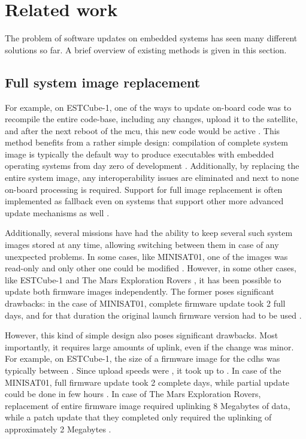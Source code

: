 \newpage
\section{Related work}

The problem of software updates on embedded systems has seen many different solutions so far. A brief overview of existing methods is given in this section.

\subsection{Full system image replacement}

For example, on ESTCube-1, one of the ways to update on-board code was to recompile the entire code-base, including any changes, upload it to the satellite, and after the next reboot of the \gls{mcu}, this new code would be active \cite{Suenter2016}. This method benefits from a rather simple design: compilation of complete system image is typically the default way to produce executables with embedded operating systems from day zero of development . Additionally, by replacing the entire system image, any interoperability issues are eliminated and next to none on-board processing is required. Support for full image replacement is often implemented as fallback even on systems that support other more advanced update mechanisms as well \cite{Tarbe2013,Greco2005,Garrido1998}.

Additionally, several missions have had the ability to keep several such system images stored at any time, allowing switching between them in case of any unexpected problems. In some cases, like MINISAT01, one of the images was read-only and only other one could be modified \cite{Garrido1998}. However, in some other cases, like  ESTCube-1 \cite{Tarbe2013} and The Mars Exploration Rovers \cite{Greco2005}, it has been possible to update both firmware images independently. The former poses significant drawbacks: in the case of MINISAT01, complete firmware update took 2 full days, and for that duration the original launch firmware version had to be used \cite{Garrido1998}. 


However, this kind of simple design also poses significant drawbacks. Most importantly, it requires large amounts of uplink, even if the change was minor. For example, on ESTCube-1, the size of a firmware image for the \gls{cdhs} was typically between . Since upload speeds were , it took up to . In case of the MINISAT01, full firmware update took 2 complete days, while partial update could be done in few hours \cite{Garrido1998}. In case of The Mars Exploration Rovers, replacement of entire firmware image required uplinking 8 Megabytes of data, while a patch update that they completed only required the uplinking of approximately 2 Megabytes \cite{Greco2005}.

